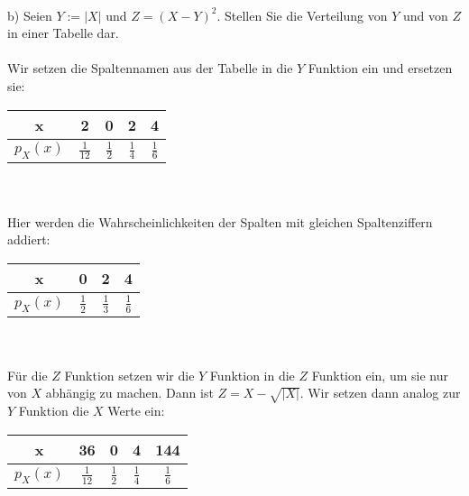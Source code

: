 \documentclass[a4paper]{article}
\begin{document}
\\
\noindent b) Seien $Y := \vert X \vert $ und $Z = (X-Y)^2$. Stellen Sie die Verteilung von $Y$ und von $Z$ in einer Tabelle dar.\\\\
Wir setzen die Spaltennamen aus der Tabelle in die $Y$ Funktion ein und ersetzen sie:\\
\begin{tabular}{c|c c c c}
    x & 2 & 0 & 2 & 4 \\
    \hline
    $p_X(x)$ & $\frac{1}{12}$ & $\frac{1}{2}$ & $\frac{1}{4}$ & $\frac{1}{6}$
\end{tabular}\\\\
Hier werden die Wahrscheinlichkeiten der Spalten mit gleichen Spaltenziffern addiert:\\
\begin{tabular}{c|c c c}
    x & 0 & 2 & 4 \\
    \hline
    $p_X(x)$ & $\frac{1}{2}$ & $\frac{1}{3}$ & $\frac{1}{6}$
\end{tabular}\\\\
Für die $Z$ Funktion setzen wir die $Y$ Funktion in die $Z$ Funktion ein, um sie nur von $X$ abhängig zu machen. Dann ist $Z = X - \sqrt{|X|}$. Wir setzen dann analog zur $Y$ Funktion die $X$ Werte ein:\\
\begin{tabular}{c|c c c c}
    x & 36 & 0 & 4 & 144 \\
    \hline
    $p_X(x)$ & $\frac{1}{12}$ & $\frac{1}{2}$ & $\frac{1}{4}$ & $\frac{1}{6}$
\end{tabular}\\\\
\end{document}
